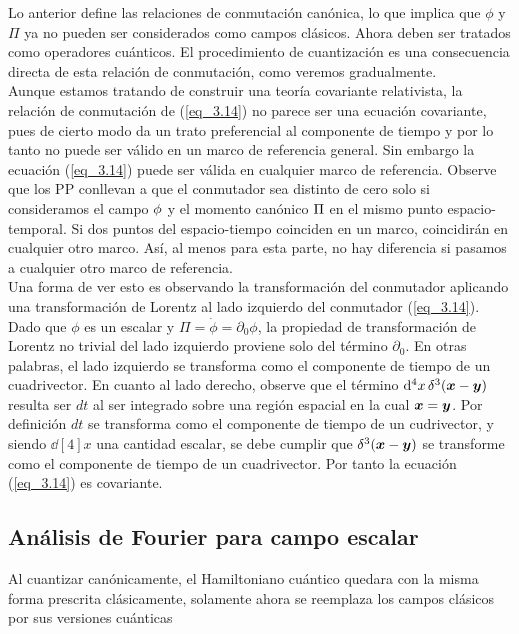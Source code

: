Lo anterior define las relaciones de conmutación canónica, lo que implica que $\phi $ y $\Pi $ ya no pueden ser considerados como campos clásicos. Ahora deben ser tratados como operadores cuánticos. El
procedimiento de cuantización es una consecuencia directa de esta relación de conmutación, como veremos gradualmente.\\

Aunque estamos tratando de construir una teoría covariante relativista, la relación de conmutación de (\ref{eq_3.14}) no parece ser una ecuación covariante, pues de cierto modo da un trato preferencial al componente de tiempo y por lo tanto no puede ser válido en un marco de referencia general. Sin embargo la ecuación (\ref{eq_3.14}) puede ser v\'{a}lida en cualquier marco de referencia. Observe que los PP conllevan a que el conmutador sea distinto de cero solo si consideramos el campo $\phi $ y el momento canónico $\Pi$ en el mismo punto espacio-temporal. Si dos puntos del espacio-tiempo coinciden en un marco, coincidirán en cualquier otro marco. Así, al menos para esta parte, no hay diferencia si pasamos a cualquier otro marco de referencia.\\

Una forma de ver esto es observando la transformación del conmutador aplicando una transformación de Lorentz al lado izquierdo del conmutador (\ref{eq_3.14}). Dado que $\phi$ es un escalar y $\Pi =\dot{\phi}=\partial_{0}\phi$, la propiedad de transformación de Lorentz no trivial del lado izquierdo proviene solo del término $\partial_{0}$. En otras palabras, el lado izquierdo se transforma como el componente de tiempo de un cuadrivector. En cuanto al lado derecho, observe que el término $\dd[4]{x} \delta^{3}(\vb*{x}-\vb*{y})$ resulta ser $dt$ al ser integrado sobre una región espacial en la cual $\vb*{x}=\vb*{y}$. Por definición $dt$ se transforma como el componente de tiempo de un cudrivector, y siendo $\dd[4]{x}$ una cantidad escalar, se debe cumplir que $\delta^{3}(\vb*{x}-\vb*{y})$ se transforme como el componente de tiempo de un cuadrivector. Por tanto la ecuación (\ref{eq_3.14}) es covariante.


\subsection{Análisis de Fourier para campo escalar}  \label{Cap_3 Subsección: Análisis de Fourier para campo escalar}

Al cuantizar canónicamente, el Hamiltoniano cuántico quedara con la misma forma prescrita clásicamente, solamente ahora se reemplaza los campos clásicos por sus versiones cuánticas

